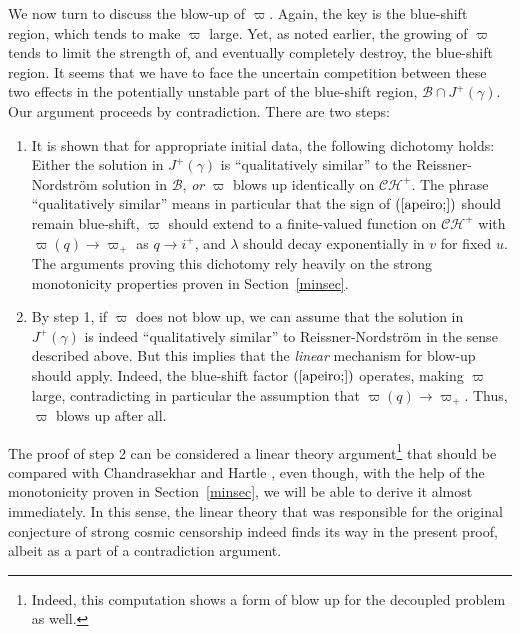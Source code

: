 \documentclass{article}
\begin{document}
{We now turn to discuss the blow-up of $\varpi$. Again, the key
is the blue-shift region, which tends to make $\varpi$ large. 
Yet, as noted earlier, the growing of $\varpi$
tends to limit the strength of, and eventually completely
destroy, the blue-shift region. It seems that we have to face
the uncertain competition between these two effects in the potentially unstable
part of the blue-shift region, $\mathcal{B}\cap J^+(\gamma)$. 
Our argument proceeds by contradiction. There are two steps:
\begin{enumerate}
\item
It is shown that 
for appropriate initial data, the following dichotomy holds:
Either the solution in $J^+(\gamma)$ is ``qualitatively
similar'' to the Reissner-Nordstr\"om solution in $\mathcal{B}$,
\emph{or} $\varpi$ blows up identically on $\mathcal{CH}^+$.
The phrase ``qualitatively similar'' means in particular
that the sign of $(\ref{apeiro;})$ should remain
blue-shift, $\varpi$ should extend to a finite-valued function
on $\mathcal{CH}^+$ with $\varpi(q)\to\varpi_+$ as $q\to i^+$,
and $\lambda$ should decay exponentially in $v$ for fixed $u$.
The arguments proving this dichotomy rely heavily on the
strong monotonicity properties proven in Section~\ref{minsec}.
\item
By step 1, if $\varpi$ does not blow up, we can assume that the solution in
$J^+(\gamma)$ is indeed ``qualitatively similar'' to Reissner-Nordstr\"om
in the sense described above. But this implies that the 
\emph{linear} mechanism for blow-up should apply.
Indeed, the blue-shift factor $(\ref{apeiro;})$ operates, 
making $\varpi$ large, 
contradicting 
in particular 
the assumption that $\varpi(q)\to\varpi_+$. Thus, $\varpi$ blows up
after all.
\end{enumerate}

The proof of step 2 can be considered a linear theory
argument\footnote{Indeed, this computation shows a form of blow up
for the  decoupled problem as well.} 
that should be compared with 
Chandrasekhar and Hartle \cite{ch:cchRN}, 
even though, with the help of the monotonicity proven
in Section~\ref{minsec}, we will be able to derive it almost immediately. 
In this sense, the
linear theory that was responsible for the original conjecture
of strong cosmic censorship
indeed finds its way in the present proof, 
albeit as a part of a contradiction argument.

}
\end{document}
